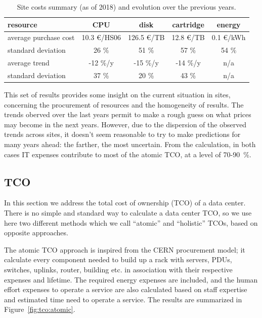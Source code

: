 \begin{table}[h]
    \centering
    \caption{Site costs summary (as of 2018) and evolution over the previous years.}
    \label{tab:sitecosts}
    \begin{tabular}{l|cccc}
        \hline
        resource & CPU & disk & cartridge & energy \\\hline
        average purchase cost & 10.3 \euro/HS06 & 126.5 \euro/TB & 12.8 \euro/TB & 0.1 \euro/kWh\\\hline
        standard deviation & 26 \% & 51 \% & 57 \% & 54 \% \\\hline
        average trend & -12 \%/y & -15 \%/y & -14 \%/y & n/a \\\hline
        standard deviation & 37 \% & 20 \% & 43 \% & n/a \\\hline
    \end{tabular}
\end{table}


This set of results provides some insight on the current situation in sites, concerning the procurement of resources and
the homogeneity of results. The trends oberved over the last years permit to make a rough guess on what prices may become
in the next years. However, due to the dispersion of the observed trends across sites, it doesn't seem reasonable to
try to make predictions for many years ahead: the farther, the most uncertain.
From the calculation, in both cases IT expenses contribute to most of the atomic TCO, at a level of 70-90~\%.

\subsection{\label{sec:sitecost:tco}TCO}

In this section we address the total cost of ownership (TCO) of a data center.
There is no simple and standard way to calculate a data center TCO, so we use here two different methods which we call
``atomic'' and ``holistic'' TCOs, based on opposite approaches.

The atomic TCO approach is inspired from the CERN procurement model; it calculate every component needed to build up
a rack with servers, PDUs, switches, uplinks, router, building etc. in association with their respective expenses and lifetime.
The required energy expenses are included, and the human effort expenses to operate a service are also calculated
based on staff expertise and estimated time need to operate a service.
The results are summarized in Figure~\ref{fig:tco:atomic}.

